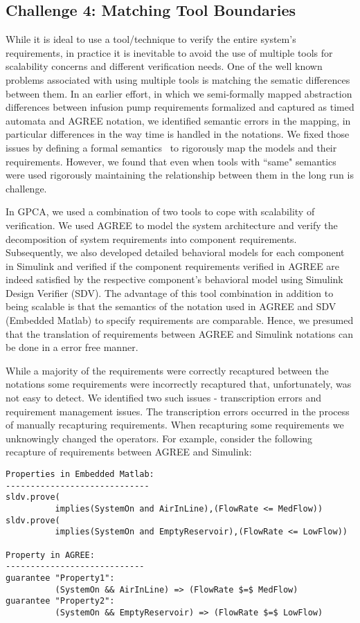 \subsection{Challenge 4: Matching Tool Boundaries}

While it is ideal to use a tool/technique to verify the entire system's requirements, in practice it is inevitable to avoid the use of multiple tools for scalability concerns and different verification needs. One of the well known problems associated with using multiple tools is matching the sematic differences between them. In an earlier effort, in which we semi-formally mapped abstraction differences between infusion pump requirements formalized and captured as timed automata and AGREE notation, we identified semantic errors in the mapping, in particular differences in the way time is handled in the notations. We fixed those issues by defining a formal semantics~\cite{whalen2015hierarchical} to rigorously map the models and their requirements. However, we found that even when tools with ``same" semantics were used rigorously maintaining the relationship between them in the long run is challenge.

In GPCA, we used a combination of two tools to cope with scalability of verification. We used AGREE to model the system architecture and verify the decomposition of system requirements into component requirements. Subsequently, we also developed detailed behavioral models for each component in Simulink and verified if the component requirements verified in AGREE are indeed satisfied by the respective component's behavioral model using Simulink Design Verifier (SDV). The advantage of this tool combination in addition to being scalable is that the semantics of the notation used in AGREE and SDV (Embedded Matlab) to specify requirements are comparable. Hence, we presumed that the translation of requirements between AGREE and Simulink notations can be done in a error free manner.

While a majority of the requirements were correctly recaptured between the notations some requirements were incorrectly recaptured that, unfortunately, was not easy to detect. We identified two such issues - transcription errors and requirement management issues. The transcription errors occurred in the process of manually recapturing requirements. When recapturing some requirements we unknowingly changed the operators. For example, consider the following recapture of requirements between AGREE and Simulink:

\scriptsize{
\begin{verbatim}
Properties in Embedded Matlab:
-----------------------------
sldv.prove(
          implies(SystemOn and AirInLine),(FlowRate <= MedFlow))
sldv.prove(
          implies(SystemOn and EmptyReservoir),(FlowRate <= LowFlow))

Property in AGREE:
----------------------------
guarantee "Property1":
          (SystemOn && AirInLine) => (FlowRate $=$ MedFlow)
guarantee "Property2":
          (SystemOn && EmptyReservoir) => (FlowRate $=$ LowFlow)
\end{verbatim}
}
\normalsize{}

